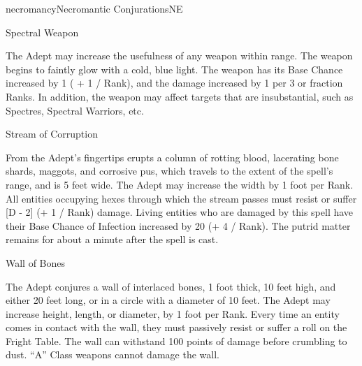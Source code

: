 \begin{College}[1.1]{necromancy}{Necromantic Conjurations}{NE}
\begin{spell}[S-13]{Spectral Weapon}

\begin{effects}
The Adept may increase the usefulness of any weapon within range. The
weapon begins to faintly glow with a cold, blue light.  The weapon has
its Base Chance increased by 1 ( + 1 / Rank), and the damage increased
by 1 per 3 or fraction Ranks.  In addition, the weapon may affect
targets that are insubstantial, such as Spectres, Spectral Warriors,
etc.
\end{effects}
\end{spell}

\begin{spell}[S-14]{Stream of Corruption}

\begin{effects}
From the Adept’s fingertips erupts a column of rotting blood,
lacerating bone shards, maggots, and corrosive pus, which travels to
the extent of the spell’s range, and is 5 feet wide. The Adept may
increase the width by 1 foot per Rank.  All entities occupying hexes
through which the stream passes must resist or suffer [D - 2] (+ 1 /
Rank) damage.  Living entities who are damaged by this spell have
their Base Chance of Infection increased by 20 (+ 4 / Rank).  The
putrid matter remains for about a minute after the spell is cast.
\end{effects}
\end{spell}

\begin{spell}[S-15]{Wall of Bones}

\begin{effects}
The Adept conjures a wall of interlaced bones, 1 foot thick, 10 feet
high, and either 20 feet long, or in a circle with a diameter of 10
feet. The Adept may increase height, length, or diameter, by 1 foot
per Rank.  Every time an entity comes in contact with the wall, they
must passively resist or suffer a roll on the Fright Table.  The wall
can withstand 100 points of damage before crumbling to dust.  “A”
Class weapons cannot damage the wall.
\end{effects}
\end{spell}


\end{College}
